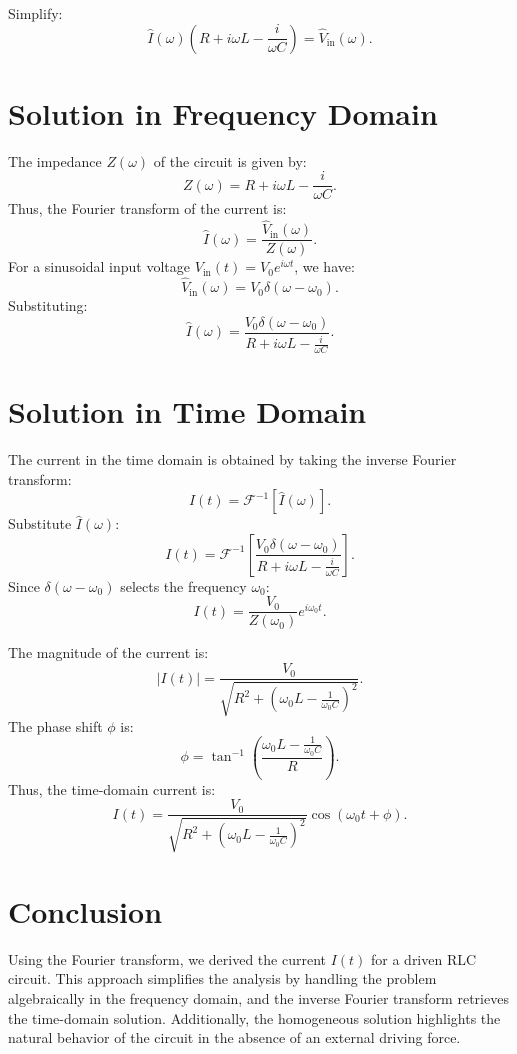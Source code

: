 \documentclass[a4paper,11pt]{article}
\begin{document}
Simplify:
\[
\hat{I}(\omega) \left(R + i\omega L - \frac{i}{\omega C}\right) = \hat{V}_{\text{in}}(\omega).
\]

\section*{Solution in Frequency Domain}
The impedance \(Z(\omega)\) of the circuit is given by:
\[
Z(\omega) = R + i\omega L - \frac{i}{\omega C}.
\]
Thus, the Fourier transform of the current is:
\[
\hat{I}(\omega) = \frac{\hat{V}_{\text{in}}(\omega)}{Z(\omega)}.
\]
For a sinusoidal input voltage \(V_{\text{in}}(t) = V_0 e^{i\omega t}\), we have:
\[
\hat{V}_{\text{in}}(\omega) = V_0 \delta(\omega - \omega_0).
\]
Substituting:
\[
\hat{I}(\omega) = \frac{V_0 \delta(\omega - \omega_0)}{R + i\omega L - \frac{i}{\omega C}}.
\]

\section*{Solution in Time Domain}
The current in the time domain is obtained by taking the inverse Fourier transform:
\[
I(t) = \mathcal{F}^{-1}\left[\hat{I}(\omega)\right].
\]
Substitute \(\hat{I}(\omega)\):
\[
I(t) = \mathcal{F}^{-1}\left[\frac{V_0 \delta(\omega - \omega_0)}{R + i\omega L - \frac{i}{\omega C}}\right].
\]
Since \(\delta(\omega - \omega_0)\) selects the frequency \(\omega_0\):
\[
I(t) = \frac{V_0}{Z(\omega_0)} e^{i\omega_0 t}.
\]

The magnitude of the current is:
\[
|I(t)| = \frac{V_0}{\sqrt{R^2 + \left(\omega_0 L - \frac{1}{\omega_0 C}\right)^2}}.
\]
The phase shift \(\phi\) is:
\[
\phi = \tan^{-1}\left(\frac{\omega_0 L - \frac{1}{\omega_0 C}}{R}\right).
\]
Thus, the time-domain current is:
\[
I(t) = \frac{V_0}{\sqrt{R^2 + \left(\omega_0 L - \frac{1}{\omega_0 C}\right)^2}} \cos(\omega_0 t + \phi).
\]

\section*{Conclusion}
Using the Fourier transform, we derived the current \(I(t)\) for a driven RLC circuit. This approach simplifies the analysis by handling the problem algebraically in the frequency domain, and the inverse Fourier transform retrieves the time-domain solution. Additionally, the homogeneous solution highlights the natural behavior of the circuit in the absence of an external driving force.
\end{document}
